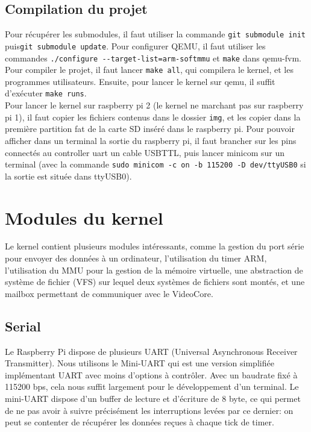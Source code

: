 \documentclass[a4paper]{article}
\begin{document}
\subsection{Compilation du projet}

Pour récupérer les submodules, il faut utiliser la commande \verb!git submodule init!
puis\verb!git submodule update!. Pour configurer QEMU, il faut utiliser les
commandes \verb!./configure --target-list=arm-softmmu! et \verb!make! dans qemu-fvm.\\

Pour compiler le projet, il faut lancer \verb!make all!, qui compilera le kernel,
et les programmes utilisateurs. Ensuite, pour lancer le kernel sur qemu, il
suffit d'exécuter \verb!make runs!.\\

Pour lancer le kernel sur raspberry pi 2 (le
kernel ne marchant pas sur raspberry pi 1), il faut copier les fichiers contenus
dans le dossier \verb!img!, et les copier dans la première partition fat de la
carte SD inséré dans le raspberry pi. Pour pouvoir afficher dans un terminal la
sortie du raspberry pi, il faut brancher sur les pins connectés au controller
uart un cable USBTTL, puis lancer minicom sur un terminal (avec la commande
\verb!sudo minicom -c on -b 115200 -D dev/ttyUSB0! si la sortie est située dans
ttyUSB0).


\section{Modules du kernel}
Le kernel contient plusieurs modules intéressants, comme la gestion du port série
pour envoyer des données à un ordinateur, l'utilisation du timer ARM,
l'utilisation du MMU pour la gestion de la mémoire virtuelle, une abstraction de
système de fichier (VFS) sur lequel deux systèmes de fichiers sont montés, et
une mailbox permettant de communiquer avec le VideoCore.

\subsection{Serial}
Le Raspberry Pi dispose de plusieurs UART (Universal Asynchronous Receiver Transmitter).
Nous utilisons le Mini-UART qui est une version simplifiée implémentant UART avec
moins d'options à contrôler. Avec un baudrate fixé à 115200 bps, cela nous suffit
largement pour le développement d'un terminal.
Le mini-UART dispose d'un buffer de lecture et d'écriture de 8 byte, ce qui permet
de ne pas avoir à suivre précisément les interruptions levées par ce dernier:
on peut se contenter de récupérer les données reçues à chaque tick de timer.
\end{document}
